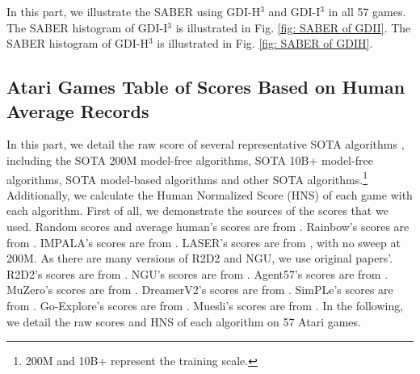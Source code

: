 \documentclass[nohyperref]{article}
\theoremstyle{plain}
\begin{document}
In this part, we  illustrate the SABER \citep{dreamerv2,atarihuman} using GDI-H$^3$ and  GDI-I$^3$ in all 57 games. The SABER histogram of GDI-I$^3$ is illustrated in Fig. \ref{fig: SABER of GDII}. The SABER histogram of GDI-H$^3$ is illustrated in Fig. \ref{fig: SABER of GDIH}.

\begin{figure*}[!ht]
	\caption{SABER (\%) of Atari 57 games using GDI-I$^3$.}
	\label{fig: SABER of GDII}
\end{figure*}


\begin{figure*}[!ht]
	\caption{SABER (\%) of Atari 57 games using GDI-H$^3$. }
	\label{fig: SABER of GDIH}
\end{figure*}
\clearpage




\subsection{Atari Games Table of Scores Based on Human Average Records}
\label{app: Atari Games Table of Scores Based on Human Average Records}
In this part, we detail the raw score of several representative SOTA algorithms , including the SOTA 200M model-free algorithms, SOTA 10B+ model-free algorithms, SOTA model-based algorithms and other SOTA algorithms.\footnote{200M and 10B+ represent the training scale.} Additionally, we calculate the Human Normalized Score (HNS) of each game with each algorithm. First of all, we demonstrate the sources of the scores that we used.
Random scores and average human's scores are from \citep{agent57}.
Rainbow's scores are from \citep{rainbow}.
IMPALA's scores are from \citep{impala}.
LASER's scores are from \citep{laser}, with no sweep at 200M.
As there are many versions of R2D2 and NGU, we use original papers'.
R2D2's scores are from \citep{r2d2}.
NGU's scores are from \citep{ngu}.
Agent57's scores are from \citep{agent57}.
MuZero's scores are from \citep{muzero}.
DreamerV2's scores are from \citep{dreamerv2}.
SimPLe's scores are from \citep{modelbasedatari}.
Go-Explore's scores are from \citep{goexplore}.
Muesli's scores are from \citep{muesli}.
In the following,  we detail the raw scores and HNS of each algorithm on 57 Atari games.
\end{document}
